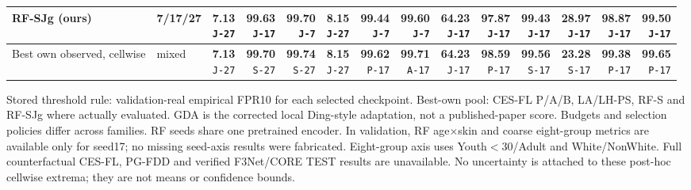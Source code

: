 \documentclass[10pt]{article}
\newcommand{\note}[1]{{\fontsize{8}{10}\selectfont #1\par}}
\begin{document}
{\begin{tabular*}{\linewidth}{@{\extracolsep{\fill}}llrrrrrrrrrrrr}
RF-SJg (ours) & 7/17/27 & \shortstack{\textbf{7.13}\\{\tiny\texttt{J-27}}} & \shortstack{\textbf{99.63}\\{\tiny\texttt{J-17}}} & \shortstack{\textbf{99.70}\\{\tiny\texttt{J-7}}} & \shortstack{\textbf{8.15}\\{\tiny\texttt{J-27}}} & \shortstack{\textbf{99.44}\\{\tiny\texttt{J-7}}} & \shortstack{\textbf{99.60}\\{\tiny\texttt{J-7}}} & \shortstack{\textbf{64.23}\\{\tiny\texttt{J-17}}} & \shortstack{\textbf{97.87}\\{\tiny\texttt{J-17}}} & \shortstack{\textbf{99.43}\\{\tiny\texttt{J-17}}} & \shortstack{\textbf{28.97}\\{\tiny\texttt{J-17}}} & \shortstack{\textbf{98.87}\\{\tiny\texttt{J-17}}} & \shortstack{\textbf{99.50}\\{\tiny\texttt{J-17}}}\\
\midrule\rowcolor{blue!8} Best own observed, cellwise & mixed & \shortstack{\textbf{7.13}\\{\tiny\texttt{J-27}}} & \shortstack{\textbf{99.70}\\{\tiny\texttt{S-27}}} & \shortstack{\textbf{99.74}\\{\tiny\texttt{S-27}}} & \shortstack{\textbf{8.15}\\{\tiny\texttt{J-27}}} & \shortstack{\textbf{99.62}\\{\tiny\texttt{P-17}}} & \shortstack{\textbf{99.71}\\{\tiny\texttt{A-17}}} & \shortstack{\textbf{64.23}\\{\tiny\texttt{J-17}}} & \shortstack{\textbf{98.59}\\{\tiny\texttt{P-17}}} & \shortstack{\textbf{99.56}\\{\tiny\texttt{S-17}}} & \shortstack{\textbf{23.28}\\{\tiny\texttt{S-17}}} & \shortstack{\textbf{99.38}\\{\tiny\texttt{P-17}}} & \shortstack{\textbf{99.65}\\{\tiny\texttt{P-17}}}\\
\bottomrule\end{tabular*}}\par
\vspace{2mm}
\note{Stored threshold rule: validation-real empirical FPR10 for each selected checkpoint. Best-own pool: CES-FL P/A/B, LA/LH-PS, RF-S and RF-SJg where actually evaluated. GDA is the corrected local Ding-style adaptation, not a published-paper score. Budgets and selection policies differ across families. RF seeds share one pretrained encoder. In validation, RF age$\times$skin and coarse eight-group metrics are available only for seed17; no missing seed-axis results were fabricated. Eight-group axis uses Youth$<$30/Adult and White/NonWhite. Full counterfactual CES-FL, PG-FDD and verified F3Net/CORE TEST results are unavailable. No uncertainty is attached to these post-hoc cellwise extrema; they are not means or confidence bounds.}
\end{document}
